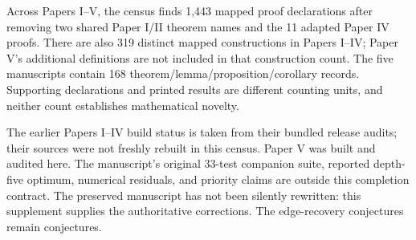 \documentclass[11pt]{article}
\begin{document}
Across Papers I--V, the census finds 1,443 mapped proof declarations after removing two shared Paper I/II theorem names and the 11 adapted Paper IV proofs. There are also 319 distinct mapped constructions in Papers I--IV; Paper V's additional definitions are not included in that construction count. The five manuscripts contain 168 theorem/lemma/proposition/corollary records. Supporting declarations and printed results are different counting units, and neither count establishes mathematical novelty.

The earlier Papers I--IV build status is taken from their bundled release audits; their sources were not freshly rebuilt in this census. Paper V was built and audited here. The manuscript's original 33-test companion suite, reported depth-five optimum, numerical residuals, and priority claims are outside this completion contract. The preserved manuscript has not been silently rewritten: this supplement supplies the authoritative corrections. The edge-recovery conjectures remain conjectures.
\end{document}
